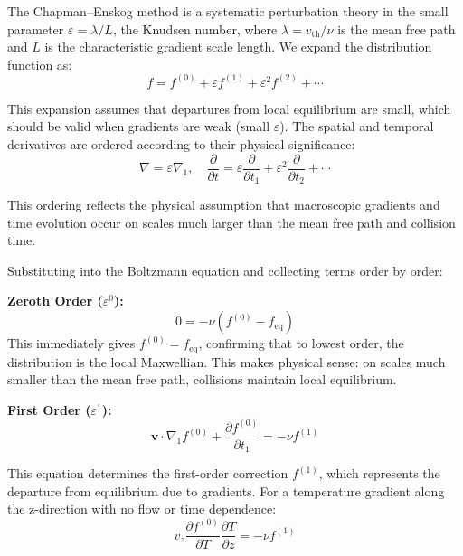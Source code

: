 \documentclass[12pt,a4paper]{article}
\newcommand{\vect}[1]{\mathbf{#1}}
\begin{document}
The Chapman--Enskog method is a systematic perturbation theory in the small parameter $\varepsilon = \lambda/L$, the Knudsen number, where $\lambda = v_{\text{th}}/\nu$ is the mean free path and $L$ is the characteristic gradient scale length. We expand the distribution function as:
\begin{equation}
f = f^{(0)} + \varepsilon f^{(1)} + \varepsilon^2 f^{(2)} + \cdots
\label{eq:chapman_enskog_expansion}
\end{equation}

This expansion assumes that departures from local equilibrium are small, which should be valid when gradients are weak (small $\varepsilon$). The spatial and temporal derivatives are ordered according to their physical significance:
\begin{equation}
\nabla = \varepsilon \nabla_1, \quad \frac{\partial}{\partial t} = \varepsilon \frac{\partial}{\partial t_1} + \varepsilon^2 \frac{\partial}{\partial t_2} + \cdots
\label{eq:derivative_ordering}
\end{equation}

This ordering reflects the physical assumption that macroscopic gradients and time evolution occur on scales much larger than the mean free path and collision time.

Substituting into the Boltzmann equation and collecting terms order by order:

\textbf{Zeroth Order ($\varepsilon^0$):}
\begin{equation}
0 = -\nu(f^{(0)} - f_{\text{eq}})
\label{eq:zeroth_order}
\end{equation}
This immediately gives $f^{(0)} = f_{\text{eq}}$, confirming that to lowest order, the distribution is the local Maxwellian. This makes physical sense: on scales much smaller than the mean free path, collisions maintain local equilibrium.

\textbf{First Order ($\varepsilon^1$):}
\begin{equation}
\vect{v} \cdot \nabla_1 f^{(0)} + \frac{\partial f^{(0)}}{\partial t_1} = -\nu f^{(1)}
\label{eq:first_order}
\end{equation}

This equation determines the first-order correction $f^{(1)}$, which represents the departure from equilibrium due to gradients. For a temperature gradient along the z-direction with no flow or time dependence:
\begin{equation}
v_z \frac{\partial f^{(0)}}{\partial T} \frac{\partial T}{\partial z} = -\nu f^{(1)}
\label{eq:first_order_temp_grad}
\end{equation}
\end{document}
